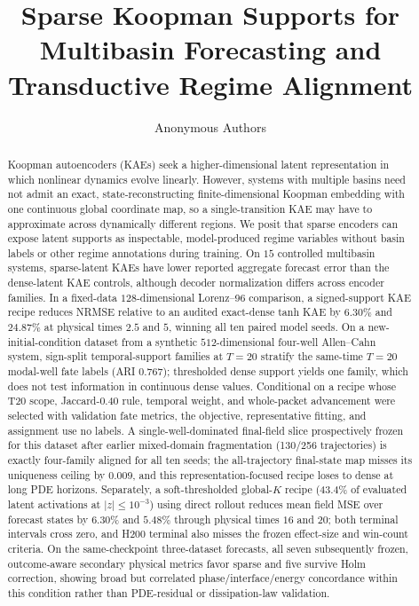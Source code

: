 \documentclass[11pt]{article}
\title{Sparse Koopman Supports for Multibasin Forecasting and Transductive Regime Alignment}
\author{Anonymous Authors}
\date{}
\begin{document}
\maketitle

\begin{abstract}
    Koopman autoencoders (KAEs) seek a higher-dimensional latent representation in which nonlinear dynamics evolve linearly.
    However, systems with multiple basins need not admit an exact, state-reconstructing finite-dimensional Koopman embedding with one continuous global coordinate map, so a single-transition KAE may have to approximate across dynamically different regions.
    We posit that sparse encoders can expose latent supports as inspectable, model-produced regime variables without basin labels or other regime annotations during training.
    On \(15\) controlled multibasin systems, sparse-latent KAEs have lower reported aggregate forecast error than the dense-latent KAE controls, although decoder normalization differs across encoder families.
    In a fixed-data \(128\)-dimensional Lorenz--96 comparison, a signed-support KAE recipe reduces NRMSE relative to an audited exact-dense tanh KAE by \(6.30\%\) and \(24.87\%\) at physical times \(2.5\) and \(5\), winning all ten paired model seeds.
    On a new-initial-condition dataset from a synthetic \(512\)-dimensional four-well Allen--Cahn system, sign-split temporal-support families at \(T=20\) stratify the same-time \(T=20\) modal-well fate labels (ARI \(0.767\)); thresholded dense support yields one family, which does not test information in continuous dense values. Conditional on a recipe whose T20 scope, Jaccard-0.40 rule, temporal weight, and whole-packet advancement were selected with validation fate metrics, the objective, representative fitting, and assignment use no labels. A single-well-dominated final-field slice prospectively frozen for this dataset after earlier mixed-domain fragmentation (130/256 trajectories) is exactly four-family aligned for all ten seeds; the all-trajectory final-state map misses its uniqueness ceiling by \(0.009\), and this representation-focused recipe loses to dense at long PDE horizons. Separately, a soft-thresholded global-\(K\) recipe (43.4\% of evaluated latent activations at \(|z|\le10^{-3}\)) using direct rollout reduces mean field MSE over forecast states by \(6.30\%\) and \(5.48\%\) through physical times \(16\) and \(20\); both terminal intervals cross zero, and H200 terminal also misses the frozen effect-size and win-count criteria. On the same-checkpoint three-dataset forecasts, all seven subsequently frozen, outcome-aware secondary physical metrics favor sparse and five survive Holm correction, showing broad but correlated phase/interface/energy concordance within this condition rather than PDE-residual or dissipation-law validation.

\end{abstract}
\end{document}
